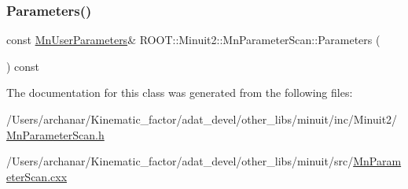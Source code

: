 \subsubsection{\texorpdfstring{Parameters()}{Parameters()}\hspace{0.1cm}{\footnotesize\ttfamily [2/2]}}
{\footnotesize\ttfamily const \mbox{\hyperlink{classROOT_1_1Minuit2_1_1MnUserParameters}{Mn\+User\+Parameters}}\& R\+O\+O\+T\+::\+Minuit2\+::\+Mn\+Parameter\+Scan\+::\+Parameters (\begin{DoxyParamCaption}{ }\end{DoxyParamCaption}) const\hspace{0.3cm}{\ttfamily [inline]}}



The documentation for this class was generated from the following files\+:\begin{DoxyCompactItemize}
\item 
/\+Users/archanar/\+Kinematic\+\_\+factor/adat\+\_\+devel/other\+\_\+libs/minuit/inc/\+Minuit2/\mbox{\hyperlink{other__libs_2minuit_2inc_2Minuit2_2MnParameterScan_8h}{Mn\+Parameter\+Scan.\+h}}\item 
/\+Users/archanar/\+Kinematic\+\_\+factor/adat\+\_\+devel/other\+\_\+libs/minuit/src/\mbox{\hyperlink{MnParameterScan_8cxx}{Mn\+Parameter\+Scan.\+cxx}}\end{DoxyCompactItemize}
